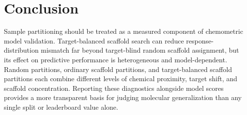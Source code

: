 \section{Conclusion}

Sample partitioning should be treated as a measured component of chemometric model validation. Target-balanced scaffold search can reduce response-distribution mismatch far beyond target-blind random scaffold assignment, but its effect on predictive performance is heterogeneous and model-dependent. Random partitions, ordinary scaffold partitions, and target-balanced scaffold partitions each combine different levels of chemical proximity, target shift, and scaffold concentration. Reporting these diagnostics alongside model scores provides a more transparent basis for judging molecular generalization than any single split or leaderboard value alone.